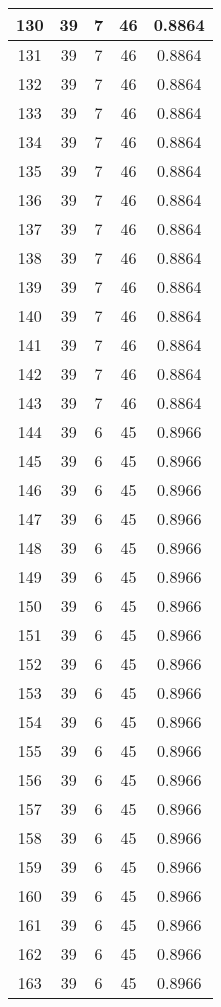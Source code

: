 \documentclass[letterpaper, 12pt]{article}
\begin{document}
\begin{longtable}{|c|c|c|c|c|}
\hline
130 & 39 & 7 & 46 & 0.8864 \\
\hline
131 & 39 & 7 & 46 & 0.8864 \\
\hline
132 & 39 & 7 & 46 & 0.8864 \\
\hline
133 & 39 & 7 & 46 & 0.8864 \\
\hline
134 & 39 & 7 & 46 & 0.8864 \\
\hline
135 & 39 & 7 & 46 & 0.8864 \\
\hline
136 & 39 & 7 & 46 & 0.8864 \\
\hline
137 & 39 & 7 & 46 & 0.8864 \\
\hline
138 & 39 & 7 & 46 & 0.8864 \\
\hline
139 & 39 & 7 & 46 & 0.8864 \\
\hline
140 & 39 & 7 & 46 & 0.8864 \\
\hline
141 & 39 & 7 & 46 & 0.8864 \\
\hline
142 & 39 & 7 & 46 & 0.8864 \\
\hline
143 & 39 & 7 & 46 & 0.8864 \\
\hline
144 & 39 & 6 & 45 & 0.8966 \\
\hline
145 & 39 & 6 & 45 & 0.8966 \\
\hline
146 & 39 & 6 & 45 & 0.8966 \\
\hline
147 & 39 & 6 & 45 & 0.8966 \\
\hline
148 & 39 & 6 & 45 & 0.8966 \\
\hline
149 & 39 & 6 & 45 & 0.8966 \\
\hline
150 & 39 & 6 & 45 & 0.8966 \\
\hline
151 & 39 & 6 & 45 & 0.8966 \\
\hline
152 & 39 & 6 & 45 & 0.8966 \\
\hline
153 & 39 & 6 & 45 & 0.8966 \\
\hline
154 & 39 & 6 & 45 & 0.8966 \\
\hline
155 & 39 & 6 & 45 & 0.8966 \\
\hline
156 & 39 & 6 & 45 & 0.8966 \\
\hline
157 & 39 & 6 & 45 & 0.8966 \\
\hline
158 & 39 & 6 & 45 & 0.8966 \\
\hline
159 & 39 & 6 & 45 & 0.8966 \\
\hline
160 & 39 & 6 & 45 & 0.8966 \\
\hline
161 & 39 & 6 & 45 & 0.8966 \\
\hline
162 & 39 & 6 & 45 & 0.8966 \\
\hline
163 & 39 & 6 & 45 & 0.8966 \\

\end{longtable}
\end{document}

